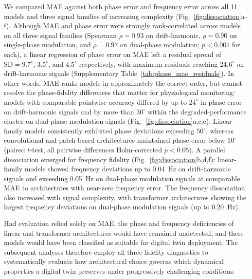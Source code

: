 We compared MAE against both phase error and frequency error across all 11 models and three signal families of increasing complexity (Fig.~\ref{fig:dissociation}a--f). Although MAE and phase error were strongly rank-correlated across models on all three signal families (Spearman $\rho = 0.93$ on drift-harmonic, $\rho = 0.90$ on single-phase modulation, and $\rho = 0.97$ on dual-phase modulation; $p < 0.001$ for each), a linear regression of phase error on MAE left a residual spread of $\mathrm{SD} = 9.7^{\circ}$, $3.5^{\circ}$, and $4.5^{\circ}$ respectively, with maximum residuals reaching $24.6^{\circ}$ on drift-harmonic signals (Supplementary Table~\ref{tab:phase_mae_residuals}). In other words, MAE ranks models in approximately the correct order, but cannot resolve the phase-fidelity differences that matter for physiological monitoring: models with comparable pointwise accuracy differed by up to $24^{\circ}$ in phase error on drift-harmonic signals and by more than $30^{\circ}$ within the degraded-performance cluster on dual-phase modulation signals (Fig.~\ref{fig:dissociation}a,c,e). Linear-family models consistently exhibited phase deviations exceeding $50^{\circ}$, whereas convolutional and patch-based architectures maintained phase error below $10^{\circ}$ (paired $t$-test, all pairwise differences Holm-corrected $p < 0.05$). A parallel dissociation emerged for frequency fidelity (Fig.~\ref{fig:dissociation}b,d,f): linear-family models showed frequency deviations up to 0.04~Hz on drift-harmonic signals and exceeding 0.05~Hz on dual-phase modulation signals at comparable MAE to architectures with near-zero frequency error. The frequency dissociation also increased with signal complexity, with transformer architectures showing the largest frequency deviations on dual-phase modulation signals (up to 0.20~Hz).

Had evaluation relied solely on MAE, the phase and frequency deficiencies of linear and transformer architectures would have remained undetected, and these models would have been classified as suitable for digital twin deployment. The subsequent analyses therefore employ all three fidelity diagnostics to systematically evaluate how architectural choice governs which dynamical properties a digital twin preserves under progressively challenging conditions.

